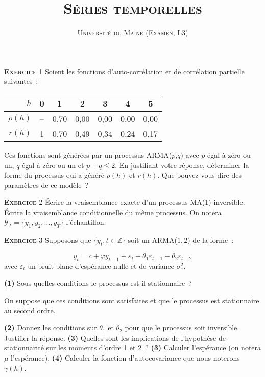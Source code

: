 \documentclass[10pt,a4paper,notitlepage,twocolumn]{article}
\newcommand{\exercice}[1]{\textsc{\textbf{Exercice}} #1}
\newcommand{\question}[1]{\textbf{(#1)}}
\begin{document}
\title{\textsc{Séries temporelles}}
\author{\textsc{Université du Maine (Examen, L3)}}
\date{}


\maketitle

\exercice{1} Soient les fonctions d'auto-corrélation et de corrélation
partielle suivantes :
\begin{table}[H]
  \centering
  \begin{tabular}{r|cccccc}
    \hline\hline
    $h$ & 0 & 1 & 2 & 3 & 4 & 5 \\\hline
    $\rho (h)$ & -- & 0,70 & 0,00 & 0,00 & 0,00 & 0,00\\
    $r (h)$ & 1 & 0,70 & 0,49 & 0,34 & 0,24 & 0,17\\
    \hline\hline
  \end{tabular}
\end{table}
\noindent Ces  fonctions sont générées par  un processus ARMA($p$,$q$)
avec $p$ égal à zéro ou un, $q$ égal  à zéro ou un et $p+q \leq 2$. En
justifiant  votre réponse,  déterminer  la forme  du  processus qui  a
généré $\rho(h)$ et $r(h)$. Que  pouvez-vous dire des paramètres de ce
modèle~?

\bigskip
\bigskip

\exercice{2} Écrire la vraisemblance exacte d'un processus MA(1)
inversible. Écrire la vraisemblance conditionnelle du même
processus. On notera $\mathcal Y_T = \{y_1, y_2, \dots, y_T\}$
l'échantillon.

\bigskip
\bigskip

\exercice{3} Supposons que $\{y_t,t\in\mathbb Z\}$ soit un ARMA($1,2$) de la forme :

\[
y_t = c + \varphi y_{t-1} + \varepsilon_t - \theta_1 \varepsilon_{t-1} - \theta_2 \varepsilon_{t-2}
\]
avec $\varepsilon_t$ un bruit blanc d'espérance nulle et de variance $\sigma_{\varepsilon}^2$.\newline

\question{1} Sous quelles conditions le processus est-il stationnaire ?\newline

On suppose que ces conditions sont satisfaites et que le processus est stationnaire au second ordre.\newline

\question{2} Donnez les conditions sur $\theta_1$ et $\theta_2$ pour
que le processus soit inversible. Justifier la réponse.  \question{3}
Quelles sont les implications de l'hypothèse de stationnarité sur les
moments d'ordre 1 et 2 ? \question{3} Calculer l'espérance (on notera
$\mu$ l'espérance). \question{4} Calculer la fonction d'autocovariance que nous noterons $\gamma(h)$.
\end{document}
